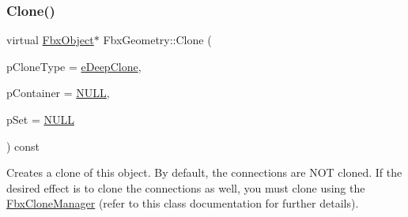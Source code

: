 \mbox{\label{class_fbx_geometry_aab95116993bd539bb870897d005d44de}} 
\subsubsection{\texorpdfstring{Clone()}{Clone()}}
{\footnotesize\ttfamily virtual \hyperlink{class_fbx_object}{Fbx\+Object}$\ast$ Fbx\+Geometry\+::\+Clone (\begin{DoxyParamCaption}\item[{\hyperlink{class_fbx_object_a9f5626b2d2135684d6ea1e6e4ad2acbb}{Fbx\+Object\+::\+E\+Clone\+Type}}]{p\+Clone\+Type = {\ttfamily \hyperlink{class_fbx_object_a9f5626b2d2135684d6ea1e6e4ad2acbbaacdf137ca059c572798287e98c4236d0}{e\+Deep\+Clone}},  }\item[{\hyperlink{class_fbx_object}{Fbx\+Object} $\ast$}]{p\+Container = {\ttfamily \hyperlink{fbxarch_8h_a070d2ce7b6bb7e5c05602aa8c308d0c4}{N\+U\+LL}},  }\item[{void $\ast$}]{p\+Set = {\ttfamily \hyperlink{fbxarch_8h_a070d2ce7b6bb7e5c05602aa8c308d0c4}{N\+U\+LL}} }\end{DoxyParamCaption}) const\hspace{0.3cm}{\ttfamily [virtual]}}

Creates a clone of this object. By default, the connections are N\+OT cloned. If the desired effect is to clone the connections as well, you must clone using the \hyperlink{class_fbx_clone_manager}{Fbx\+Clone\+Manager} (refer to this class documentation for further details).


